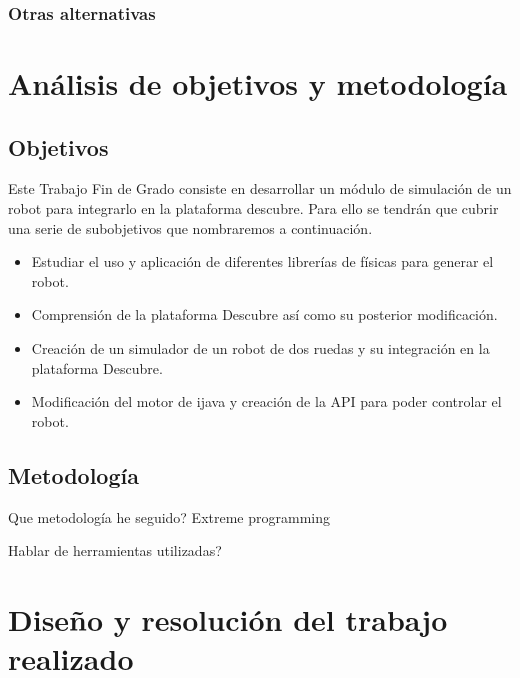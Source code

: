 \subsection{{\color{green}Otras alternativas}}
\label{sec:online-alternativas}





\chapter{Análisis de objetivos y metodología}\label{objetivos-metodologia}

\section{Objetivos}
\label{sec:Objetivos}

Este Trabajo Fin de Grado consiste en desarrollar un módulo de simulación de un robot para integrarlo en la plataforma \Gls{descubre}. Para ello se tendrán que cubrir una serie de subobjetivos que nombraremos a continuación.
\begin{itemize}
\item Estudiar el uso y aplicación de diferentes librerías de físicas para generar el robot.
\item Comprensión de la plataforma Descubre así como su posterior modificación.
\item Creación de un simulador de un robot de dos ruedas y su integración en la plataforma Descubre.
\item Modificación del motor de \gls{ijava} y creación de la \acrshort{API} para poder controlar el robot.
\end{itemize}

\section{Metodología}
\label{sec:metodologia}

{\color{green}
Que metodología he seguido? Extreme programming


Hablar de herramientas utilizadas?
}

\chapter{Diseño y resolución del trabajo realizado}\label{diseno}


